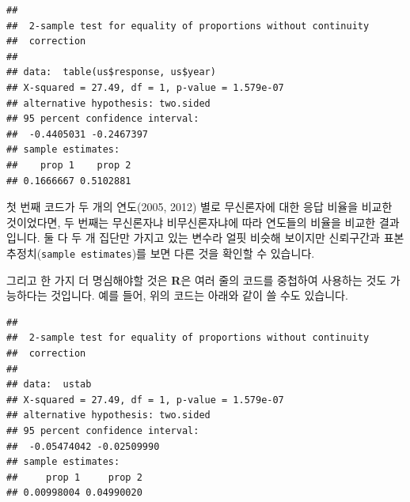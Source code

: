 \documentclass[]{book}
\newenvironment{Shaded}{\begin{snugshade}}{\end{snugshade}}
\newcommand{\CommentTok}[1]{\textcolor[rgb]{0.56,0.35,0.01}{\textit{#1}}}
\newcommand{\DataTypeTok}[1]{\textcolor[rgb]{0.13,0.29,0.53}{#1}}
\newcommand{\KeywordTok}[1]{\textcolor[rgb]{0.13,0.29,0.53}{\textbf{#1}}}
\newcommand{\NormalTok}[1]{#1}
\newcommand{\OperatorTok}[1]{\textcolor[rgb]{0.81,0.36,0.00}{\textbf{#1}}}
\newcommand{\OtherTok}[1]{\textcolor[rgb]{0.56,0.35,0.01}{#1}}
\newcommand{\StringTok}[1]{\textcolor[rgb]{0.31,0.60,0.02}{#1}}
\begin{document}
\begin{Shaded}
\end{Shaded}

\begin{verbatim}
## 
##  2-sample test for equality of proportions without continuity
##  correction
## 
## data:  table(us$response, us$year)
## X-squared = 27.49, df = 1, p-value = 1.579e-07
## alternative hypothesis: two.sided
## 95 percent confidence interval:
##  -0.4405031 -0.2467397
## sample estimates:
##    prop 1    prop 2 
## 0.1666667 0.5102881
\end{verbatim}

첫 번째 코드가 두 개의 연도(2005, 2012) 별로 무신론자에 대한 응답 비율을 비교한 것이었다면, 두 번째는 무신론자냐 비무신론자냐에 따라 연도들의 비율을 비교한 결과입니다. 둘 다 두 개 집단만 가지고 있는 변수라 얼핏 비슷해 보이지만 신뢰구간과 표본 추정치(\texttt{sample\ estimates})를 보면 다른 것을 확인할 수 있습니다.

그리고 한 가지 더 명심해야할 것은 \textbf{R}은 여러 줄의 코드를 중첩하여 사용하는 것도 가능하다는 것입니다. 예를 들어, 위의 코드는 아래와 같이 쓸 수도 있습니다.

\begin{Shaded}
\end{Shaded}

\begin{verbatim}
## 
##  2-sample test for equality of proportions without continuity
##  correction
## 
## data:  ustab
## X-squared = 27.49, df = 1, p-value = 1.579e-07
## alternative hypothesis: two.sided
## 95 percent confidence interval:
##  -0.05474042 -0.02509990
## sample estimates:
##     prop 1     prop 2 
## 0.00998004 0.04990020
\end{verbatim}
\end{document}
